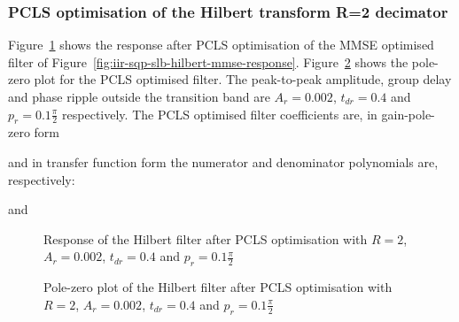 \documentclass[a4paper,twoside,10pt,english]{report}
\begin{document}
\subsubsection{PCLS optimisation of the Hilbert transform R=2 decimator}
Figure~\ref{fig:iir-sqp-slb-hilbert-pcls-response} shows the response 
after PCLS optimisation of the MMSE optimised filter of
Figure~\ref{fig:iir-sqp-slb-hilbert-mmse-response}.
Figure~\ref{fig:iir-sqp-slb-hilbert-pcls-pz} shows the pole-zero plot for the
PCLS optimised filter. The peak-to-peak amplitude, group delay and phase
ripple outside the transition band are $A_{r}=0.002$, $t_{dr}=0.4$ and 
$p_{r}=0.1\frac{\pi}{2}$ respectively. The PCLS optimised filter coefficients
are, in gain-pole-zero form
\begin{small}

\end{small}
and in transfer function form the numerator and denominator polynomials are,
respectively:
\begin{small}

\end{small}
and
\begin{small}

\end{small}
\begin{figure}[!htbp]
\begin{center}
\scalebox{0.7}{}
\caption{Response of the Hilbert filter after PCLS optimisation with 
$R=2$, $A_{r}=0.002$, $t_{dr}=0.4$ and $p_{r}=0.1\frac{\pi}{2}$}
\label{fig:iir-sqp-slb-hilbert-pcls-response}
\end{center}
\end{figure}
\begin{figure}[!htbp]
\begin{center}
\scalebox{0.7}{}
\caption{Pole-zero plot of the Hilbert filter after PCLS optimisation with 
$R=2$, $A_{r}=0.002$, $t_{dr}=0.4$ and $p_{r}=0.1\frac{\pi}{2}$}
\label{fig:iir-sqp-slb-hilbert-pcls-pz}
\end{center}
\end{figure}
\clearpage
\end{document}
